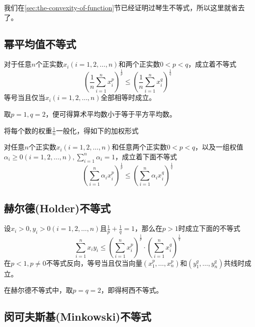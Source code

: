 我们在\ref{sec:the-convexity-of-function}节已经证明过琴生不等式，所以这里就省去了。

\subsection{幂平均值不等式}

\begin{theorem}[幂平均值不等式]
  对于任意$n$个正实数$x_i(i=1,2,\ldots,n)$和两个正实数$0<p<q$，成立着不等式
  \begin{equation}
    \label{eq:pow-mean-inequation}
    \left( \frac{1}{n}\sum_{i=1}^nx_i^{p} \right)^{\frac{1}{p}}
    \leqslant \left( \frac{1}{n}\sum_{i=1}^nx_i^{q} \right)^{\frac{1}{q}}
  \end{equation}
  等号当且仅当$x_i(i=1,2,\ldots,n)$全部相等时成立。
\end{theorem}
取$p=1,q=2$，便可得算术平均数小于等于平方平均数。

将每个数的权重$\frac{1}{n}$一般化，得如下的加权形式
\begin{theorem}[加权幂平均值不等式]
  对任意$n$个正实数$x_i(i=1,2,\ldots,n)$和任意两个正实数$0<p<q$，以及一组权值$\alpha_i \geqslant 0(i=1,2,\ldots,n), \sum_{i=1}^n\alpha_i=1$，成立着下面不等式
  \begin{equation}
    \label{eq:pow-mean-inequation-with-weight}
    \left( \sum_{i=1}^n\alpha_ix_i^p \right)^{\frac{1}{p}}
    \leqslant \left( \sum_{i=1}^n\alpha_ix_i^q \right)^{\frac{1}{q}}
  \end{equation}
\end{theorem}

\subsection{赫尔德(Holder)不等式}

\begin{theorem}[赫尔德不等式]
  设$x_i> 0, y_i> 0 (i=1,2,\ldots,n)$且$\frac{1}{p}+\frac{1}{q}=1$，那么在$p>1$时成立下面的不等式
  \begin{equation}
    \label{eq:holder-inequation}
    \sum_{i=1}^nx_iy_i \leqslant \left( \sum_{i=1}^nx_i^p \right)^{\frac{1}{p}} \cdot \left( \sum_{i=1}^nx_i^q \right)^{\frac{1}{q}}
  \end{equation}
  在$p<1,p\neq 0$不等式反向，等号当且仅当向量$(x_1^p,\ldots,x_n^p)$和$(y_1^q,\ldots,y_n^q)$共线时成立。
\end{theorem}
在赫尔德不等式中，取$p=q=2$，即得柯西不等式。

\subsection{闵可夫斯基(Minkowski)不等式}


